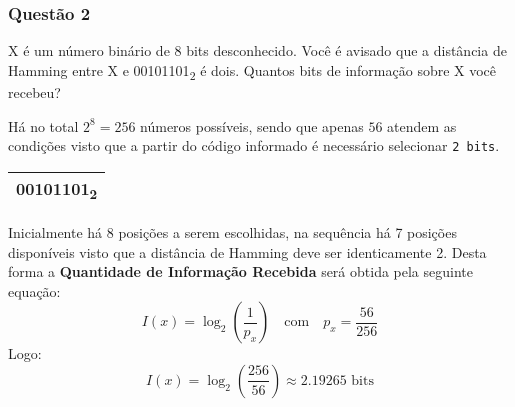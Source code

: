 \documentclass[es572.tex]{subfiles}
\begin{document}
        \newpage\subsubsection{Questão 2}
            \begin{exercise}
                X é um número binário de 8 bits desconhecido. Você é avisado que a distância de Hamming entre X e 00101101\textsubscript{2} é dois. Quantos bits de informação sobre X você recebeu?
            \end{exercise}
            \begin{resolution}
                Há no total $2^{8} = 256$ números possíveis, sendo que apenas $56$ atendem as condições visto que a partir do código informado é necessário selecionar \texttt{2 bits}.
                    \begin{table}[H]
                        \centering
                        \begin{tabular}[]{c}\hline
                            00101101\textsubscript{2}\\\hline
                        \end{tabular}
                    \end{table}\noindent
                Inicialmente há 8 posições a serem escolhidas, na sequência há 7 posições disponíveis visto que a distância de Hamming deve ser identicamente 2. Desta forma a \textbf{Quantidade de Informação Recebida} será obtida pela seguinte equação:
                    \begin{equation*}
                        I(x) = \log_{2}\left(\frac{1}{p_{x}}\right)
                        \quad\text{com}\quad
                        p_{x} = \frac{56}{256}
                    \end{equation*}
                Logo:
                    \begin{equation*}
                        I(x) = \log_{2}\left(\frac{256}{56}\right) \approx 2.19265 \text{ bits}
                    \end{equation*}
            \end{resolution}
\end{document}
